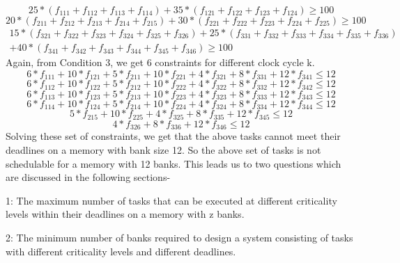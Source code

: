 \newline
\begin{equation}
 25 * (f_{111} + f_{112} + f_{113} + f_{114}) + 35 * (f_{121} + f_{122} + f_{123} + f_{124}) \geq 100 
\end{equation}
\begin{equation}
 20 * (f_{211} + f_{212} + f_{213} + f_{214} + f_{215}) + 30 * (f_{221} + f_{222} + f_{223} + f_{224} + f_{225}) \geq 100
\end{equation}
\begin{equation}
\begin{split}
 15 * (f_{321} + f_{322} + f_{323} + f_{324} + f_{325} + f_{326}) + 25 * (f_{331} + f_{332} + f_{333} + f_{334} + f_{335} + 
 f_{336}) \\
 + 40 * (f_{341} + f_{342} + f_{343} + f_{344} + f_{345} + f_{346}) \geq 100
 \end{split}
\end{equation}
\newline
Again, from Condition 3, we get 6 constraints for different clock cycle k.
\newline
\begin{equation}
 6 * f_{111} + 10 * f_{121} + 5 * f_{211} + 10 * f_{221} + 4 * f_{321} + 8 * f_{331} + 12 * f_{341} \leq 12
\end{equation}
\begin{equation}
 6 * f_{112} + 10 * f_{122} + 5 * f_{212} + 10 * f_{222} + 4 * f_{322} + 8 * f_{332} + 12 * f_{342} \leq 12
\end{equation}
\begin{equation}
 6 * f_{113} + 10 * f_{123} + 5 * f_{213} + 10 * f_{223} + 4 * f_{323} + 8 * f_{333} + 12 * f_{343} \leq 12
\end{equation}
\begin{equation}
 6 * f_{114} + 10 * f_{124} + 5 * f_{214} + 10 * f_{224} + 4 * f_{324} + 8 * f_{334} + 12 * f_{344} \leq 12
\end{equation}
\begin{equation}
 5 * f_{215} + 10 * f_{225} + 4 * f_{325} + 8 * f_{335} + 12 * f_{345} \leq 12
\end{equation}
\begin{equation}
 4 * f_{326} + 8 * f_{336} + 12 * f_{346} \leq 12
\end{equation}
\newline
Solving these set of constraints, we get that the above tasks cannot meet their deadlines on a memory with bank size 12.  
So the above set of tasks is not schedulable for a memory with 12 banks. This leads us to two questions which are discussed 
in the following sections-
\begin{description}

\item {1}: The maximum number of tasks that can be executed at different criticality levels within their deadlines on a 
memory with z banks.

\item {2}: The minimum number of banks required to design a system consisting of tasks with different criticality levels 
and different deadlines.

\end{description}

